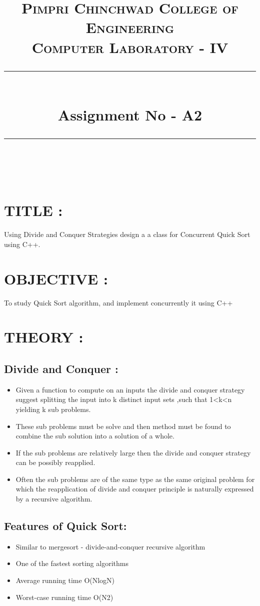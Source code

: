 \documentclass{article}
\title{
	\normalfont \normalsize 
	\textsc{Pimpri Chinchwad College of Engineering \\ 
		Computer Laboratory - IV} \\
	[10pt] 
	\rule{\linewidth}{0.5pt} \\[6pt] 
	\huge Assignment No - A2 \\
	\rule{\linewidth}{2pt}  \\[10pt]
}
\author{}
\date{\normalsize}
\begin{document}
	\maketitle
	\begin{center}
	\end{center}
	
	
	\section{TITLE : } Using Divide and Conquer Strategies design a a class for Concurrent Quick Sort using C++.
	
	\section{OBJECTIVE : }  To study Quick Sort  algorithm, and implement concurrently it using C++
	
	\section{THEORY : }
	
	\subsection{Divide and Conquer : }
	\begin{itemize}
		\item Given a function to compute on an inputs the divide and conquer strategy suggest splitting the input into k distinct input sets ,such that 1<k<n yielding k sub problems.
		\item These sub problems must be solve and then method must be found to combine the sub solution into a solution of a whole.
		\item If the sub problems are relatively large then the divide and conquer strategy can be possibly reapplied.
		\item Often the sub problems are of the same type as the same original problem for which the reapplication of divide and conquer principle is naturally expressed by a recursive algorithm.
	\end{itemize}
	
	\subsection{Features of Quick Sort:}
	\begin{itemize}
		\item Similar to mergesort - divide-and-conquer recursive algorithm 
		\item One of the fastest sorting algorithms 
		\item Average running time O(NlogN) 
		\item Worst-case running time O(N2)
	\end{itemize}
	
\end{document}
